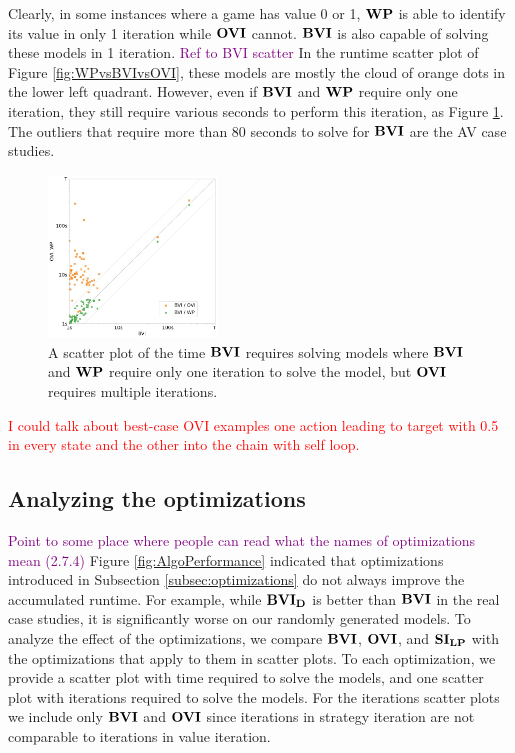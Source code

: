 Clearly, in some instances where a game has value 0 or 1, $\mathbf{WP}$ is able to identify its value in only 1 iteration while $\mathbf{OVI}$ cannot.
$\BVI$ is also capable of solving these models in 1 iteration. \textcolor{purple}{Ref to BVI scatter}
In the runtime scatter plot of Figure \ref{fig:WPvsBVIvsOVI}, these models are mostly the cloud of orange dots in the lower left quadrant.
However, even if $\BVI$ and $\mathbf{WP}$ require only one iteration, they still require various seconds to perform this iteration, as Figure \ref{fig:BVI1IterationTime}.
The outliers that require more than 80 seconds to solve for $\BVI$ are the AV case studies.
\begin{figure}[h!]
    \centering
    \includegraphics[width=0.4\textwidth]{figures/BVI_1_Iteration_vs_OVI.jpg}
    \caption[Time $\BVI$ requires solving models where it only needs one iteration]{
        A scatter plot of the time $\BVI$ requires solving models where $\BVI$ and $\mathbf{WP}$ require only one iteration to solve the model, 
        but $\mathbf{OVI}$ requires multiple iterations. 
    }
    \label{fig:BVI1IterationTime}
\end{figure}
\FloatBarrier

\textcolor{red}{I could talk about best-case OVI examples one action leading to target with 0.5 in every state and the other into the chain with self loop.}

\subsection{Analyzing the optimizations}
\textcolor{purple}{Point to some place where people can read what the names of optimizations mean (2.7.4)}
Figure \ref{fig:AlgoPerformance} indicated that optimizations introduced in Subsection \ref{subsec:optimizations} do not always improve the accumulated runtime. 
For example, while $\mathbf{BVI_D}$ is better than $\BVI$ in the real case studies, it is significantly worse on our randomly generated models.
To analyze the effect of the optimizations, we compare $\BVI$, $\mathbf{OVI}$, and $\mathbf{SI_{LP}}$ with the optimizations that apply to them in scatter plots.
To each optimization, we provide a scatter plot with time required to solve the models, and one scatter plot with iterations required to solve the models.
For the iterations scatter plots we include only $\BVI$ and $\mathbf{OVI}$ since iterations in strategy iteration are not comparable to iterations in value iteration.

